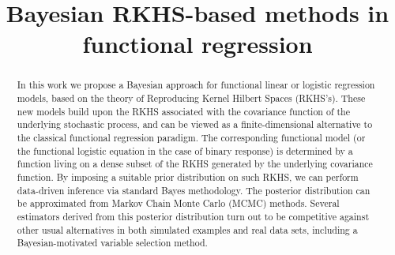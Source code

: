 \documentclass[ba]{imsart}
\numberwithin{equation}{section}
\theoremstyle{plain}
\begin{document}
\begin{frontmatter}
\title{Bayesian RKHS-based methods in functional regression}


\begin{abstract}
In this work we propose a Bayesian approach for functional linear or logistic  regression models, based on the theory of Reproducing Kernel Hilbert Spaces (RKHS's). These new models build upon the RKHS associated with the covariance function of the underlying stochastic process, and can be viewed as a finite-dimensional alternative to the classical functional regression paradigm. The corresponding functional model (or the functional logistic equation in the case of binary response) is determined by a function living on a dense subset of the RKHS generated by the underlying covariance function. By imposing a suitable prior distribution on such RKHS, we can perform data-driven inference via standard Bayes methodology. The posterior distribution can be approximated from Markov Chain Monte Carlo (MCMC) methods. Several estimators derived from this posterior distribution turn out to be competitive against other usual  alternatives in both simulated examples and real data sets, including a Bayesian-motivated variable selection method.
\end{abstract}

\begin{keyword}[class=MSC]
\end{keyword}

\begin{keyword}
\end{keyword}

\end{frontmatter}
\end{document}
